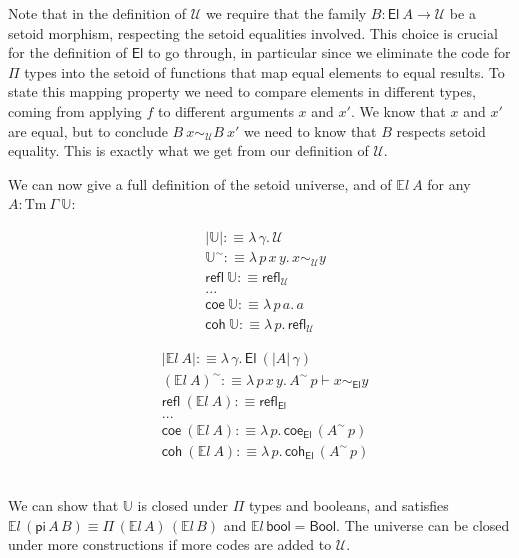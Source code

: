 \documentclass[autoref]{llncs}
\newcommand{\GG}{\Gamma}
\newcommand{\setoidU}{\mathcal{U}}
\newcommand{\Tm}{\mathrm{Tm}}
\newcommand{\El}{\textsf{El}}
\newcommand{\Uty}{\mathds{U}}
\newcommand{\EL}{\mathds{E}l}
\newcommand{\reflu}{\textsf{refl}_\setoidU}
\newcommand{\reflel}{\textsf{refl}_\El}
\newcommand{\equ}[2]{#1 \sim_\setoidU #2}
\newcommand{\eqel}[3]{#1 \vdash #2 \sim_\El #3}
\begin{document}
Note that in the definition of $\setoidU$ we require that the family $B : \El\ A
\to \setoidU$ be a setoid morphism, respecting the setoid equalities involved.
%
This choice is crucial for the definition of $\El$ to go through, in particular
since we eliminate the code for $\Pi$ types into the setoid of functions that
map equal elements to equal results. To state this mapping property we need to
compare elements in different types, coming from applying $f$ to different
arguments $x$ and $x'$. We know that $x$ and $x'$ are equal, but to conclude
$\equ{B\ x}{B\ x'}$ we need to know that $B$ respects setoid equality. This is
exactly what we get from our definition of $\setoidU$.

We can now give a full definition of the setoid universe, and of $\EL\ A$ for
any $A : \Tm\ \GG\ \Uty$: \\
\vspace{-0.2em}
\begin{minipage}{0.5\textwidth}
\begin{align*}
  & | \Uty | :\equiv \lambda\, \gamma . \, \setoidU \\
  & \Uty^\sim :\equiv \lambda \,p\, x\, y . \,x \sim_{\setoidU} y \\
  & \textsf{refl}\ \Uty :\equiv \reflu \\
  & ... \\
  & \textsf{coe}\ \Uty :\equiv \lambda\,p\,a . \, a \\
  & \textsf{coh}\ \Uty :\equiv \lambda\,p . \, \reflu
\end{align*}
\end{minipage}
\begin{minipage}{0.5\textwidth}
\begin{align*}
  & | \EL\ A | :\equiv \lambda \, \gamma . \, \El\ (| A | \,\gamma) \\
  & (\EL\ A)^\sim :\equiv \lambda \, p \, x \, y . \, \eqel{A^\sim\,p}{x}{y} \\
  & \textsf{refl}\ (\EL\ A) :\equiv \reflel \\
  & ... \\
  & \textsf{coe}\ (\EL\ A) :\equiv \lambda\,p.\, \textsf{coe}_{\El}\,(A^\sim\,p) \\
  & \textsf{coh}\ (\EL\ A) :\equiv \lambda\,p.\, \textsf{coh}_{\El}\,(A^\sim\,p)
\end{align*}
\end{minipage}
\\

We can show that $\Uty$ is closed under $\Pi$ types and booleans, and satisfies
$\EL\,(\mathsf{pi}\,A\,B) \equiv \Pi\,(\EL\,A)\,(\EL\,B)$ and
$\EL\,\mathsf{bool} = \mathsf{Bool}$. The universe can be closed under more
constructions if more codes are added to $\setoidU$.
\end{document}
